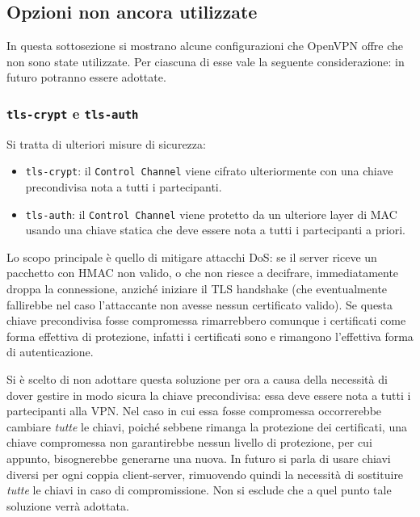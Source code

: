\subsection{Opzioni non ancora utilizzate}
In questa sottosezione si mostrano alcune configurazioni che OpenVPN offre che
non sono state utilizzate. Per ciascuna di esse vale la seguente considerazione:
in futuro potranno essere adottate.

\subsubsection{\texttt{tls-crypt} e \texttt{tls-auth}} Si tratta di ulteriori
misure di sicurezza:
\begin{itemize}
  \item \texttt{tls-crypt}: il \texttt{Control Channel} viene cifrato ulteriormente
  con una chiave precondivisa nota a tutti i partecipanti.
  \item \texttt{tls-auth}: il \texttt{Control Channel} viene protetto da un ulteriore
  layer di MAC usando una chiave statica che deve essere nota a tutti i partecipanti a priori.
\end{itemize}
Lo scopo principale è quello di mitigare attacchi DoS: se il server riceve un pacchetto con HMAC non valido,
  o che non riesce a decifrare, immediatamente droppa la connessione, anziché iniziare
  il TLS handshake (che eventualmente fallirebbe nel caso l'attaccante non avesse
  nessun certificato valido).
Se questa chiave precondivisa fosse compromessa rimarrebbero comunque i certificati
come forma effettiva di protezione, infatti i certificati sono e rimangono
l'effettiva forma di autenticazione.

Si è scelto di non adottare questa soluzione per ora a causa della necessità di dover gestire
in modo sicura la chiave precondivisa: essa deve essere nota a tutti i partecipanti
alla VPN. Nel caso in cui essa fosse compromessa occorrerebbe cambiare \textit{tutte}
le chiavi, poiché sebbene rimanga la protezione dei certificati, una chiave
compromessa non garantirebbe nessun livello di protezione, per cui appunto, bisognerebbe
generarne una nuova.
In futuro si parla di usare
chiavi diversi per ogni coppia client-server, rimuovendo quindi la necessità di sostituire
\textit{tutte} le chiavi in caso di compromissione.
Non si esclude che a quel punto tale soluzione verrà adottata.

